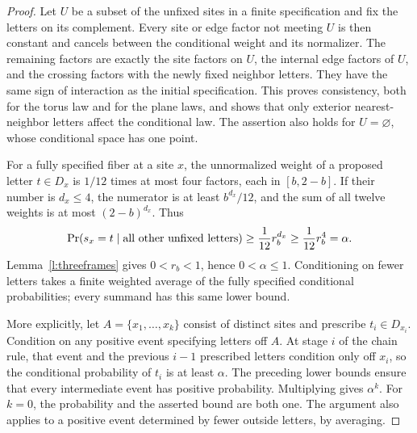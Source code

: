 \begin{proof}
Let \(U\) be a subset of the unfixed sites in a finite specification
and fix the letters on its complement. Every site or edge factor
not meeting \(U\) is then constant and cancels between the
conditional weight and its normalizer. The remaining factors are
exactly the site factors on \(U\), the internal edge factors of
\(U\), and the crossing factors with the newly fixed neighbor
letters. They have the same sign of interaction as the initial
specification. This proves consistency, both for the torus law and
for the plane laws, and shows that only exterior nearest-neighbor
letters affect the conditional law. The assertion also holds for
\(U=\varnothing\), whose conditional space has one point.

For a fully specified fiber at a site \(x\), the unnormalized
weight of a proposed letter \(t\in D_x\) is \(1/12\) times
at most four factors, each in \([b,2-b]\). If their number is
\(d_x\le4\), the numerator is at least \(b^{d_x}/12\),
and the sum of all twelve weights is at most \((2-b)^{d_x}\).
Thus
\[
 \Pr(s_x=t\mid\hbox{all other unfixed letters})
 \ge\frac1{12}r_b^{d_x}\ge\frac1{12}r_b^4=\alpha.
\]
Lemma~\ref{l:threeframes} gives \(0<r_b<1\), hence
\(0<\alpha\le1\). Conditioning on fewer letters takes a finite
weighted average of the fully specified conditional probabilities;
every summand has this same lower bound.

More explicitly, let \(A=\{x_1,\ldots,x_k\}\) consist of
distinct sites and prescribe \(t_i\in D_{x_i}\). Condition on
any positive event specifying letters off \(A\). At stage \(i\)
of the chain rule, that event and the previous \(i-1\) prescribed
letters condition only off \(x_i\), so the conditional probability
of \(t_i\) is at least \(\alpha\). The preceding lower bounds
ensure that every intermediate event has positive probability.
Multiplying gives \(\alpha^k\). For \(k=0\), the probability
and the asserted bound are both one. The argument also applies to
a positive event determined by fewer outside letters, by averaging.


\end{proof}
